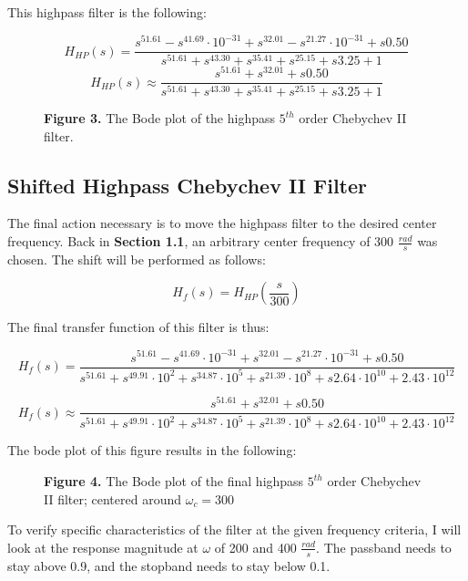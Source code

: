 \documentclass[11pt]{article}
\begin{document}
This highpass filter is the following:

$$H_{HP}(s)=\frac{s^51.61-s^41.69\cdot10^{-31}+s^32.01-s^21.27\cdot 10^{-31}+s0.50}{s^51.61+s^43.30+s^35.41+s^25.15+s3.25+1}$$
$$H_{HP}(s)\approx 
\frac{s^51.61+s^32.01+s0.50}{s^51.61+s^43.30+s^35.41+s^25.15+s3.25+1}$$

\begin{figure}[H]
\begin{center}
\caption{\textbf{Figure 3.} The Bode plot of the highpass $5^{th}$ order Chebychev II filter.}
\end{center}
\end{figure}

\subsection{Shifted Highpass Chebychev II Filter}
The final action necessary is to move the highpass filter to the desired center frequency. Back in \textbf{Section 1.1}, an arbitrary center frequency of 300 $\frac{rad}{s}$ was chosen. The shift will be performed as follows:

$$H_f(s)=H_{HP}(\frac{s}{300})$$

The final transfer function of this filter is thus:

$$H_f(s)=\frac{s^51.61-s^41.69\cdot10^{-31}+s^32.01-s^21.27\cdot 10^{-31}+s0.50}{s^51.61+s^49.91\cdot 10^2+s^34.87\cdot 10^5+s^21.39\cdot 10^8+s2.64\cdot 10^{10}+2.43\cdot 10^{12}}$$

$$H_f(s)\approx \frac{s^51.61+s^32.01+s0.50}{s^51.61+s^49.91\cdot 10^2+s^34.87\cdot 10^5+s^21.39\cdot 10^8+s2.64\cdot 10^{10}+2.43\cdot 10^{12}}$$

The bode plot of this figure results in the following:

\begin{figure}[H]
\begin{center}
\caption{\textbf{Figure 4.} The Bode plot of the final highpass $5^{th}$ order Chebychev II filter; centered around $\omega _c = 300$}
\end{center}
\end{figure}

To verify specific characteristics of the filter at the given frequency criteria, I will look at the response magnitude at $\omega$ of 200 and 400 $\frac{rad}{s}$. The passband needs to stay above 0.9, and the stopband needs to stay below 0.1.
\end{document}

